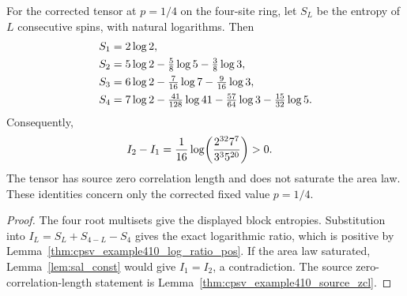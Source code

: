 \begin{lemma}
    \label{thm:cpsv_example410_tensor_entropy_obstruction}
    \leanok
    For the corrected tensor at $p=1/4$ on the four-site ring, let $S_L$ be
    the entropy of $L$ consecutive spins, with natural logarithms. Then
    \begin{align}
        S_1 & =2\log 2,\notag                                     \\
        S_2 & =5\log 2-\tfrac58\log 5-\tfrac38\log 3,\notag       \\
        S_3 & =6\log 2-\tfrac7{16}\log 7-\tfrac9{16}\log 3,\notag \\
        S_4 & =7\log 2-\tfrac{41}{128}\log 41
        -\tfrac{57}{64}\log 3-\tfrac{15}{32}\log 5.\notag
    \end{align}
    Consequently,
    \begin{align}
        I_2-I_1
         & =\frac1{16}\log\!\left(
        \frac{2^{32}7^7}{3^3 5^{20}}\right)>0.\notag
    \end{align}
    The tensor has source zero correlation length and does not saturate the
    area law. These identities concern only the corrected fixed value
    $p=1/4$.
\end{lemma}

\begin{proof}
    \leanok
    The four root multisets give the displayed block entropies. Substitution
    into $I_L=S_L+S_{4-L}-S_4$ gives the exact logarithmic ratio, which is
    positive by Lemma~\ref{thm:cpsv_example410_log_ratio_pos}. If the area
    law saturated, Lemma~\ref{lem:sal_const} would give $I_1=I_2$, a
    contradiction. The source zero-correlation-length statement is
    Lemma~\ref{thm:cpsv_example410_source_zcl}.
\end{proof}

